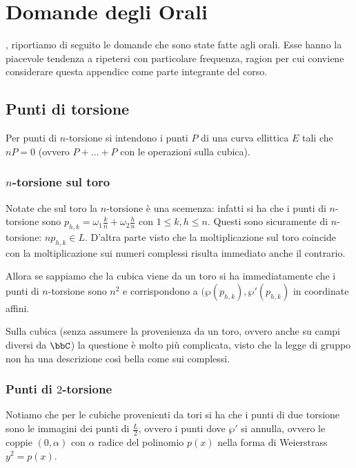 \chapter{Domande degli Orali}
\justify

, riportiamo di seguito le domande che sono state fatte agli orali.
Esse hanno la piacevole tendenza a ripetersi con particolare frequenza, ragion per cui conviene considerare questa appendice come parte integrante del corso.

\section{Punti di torsione}
Per punti di $n$-torsione si intendono i punti $P$ di una curva ellittica $E$ tali che $nP = 0$ (ovvero $P + \ldots + P$ con le operazioni sulla cubica).

\subsection{$n$-torsione sul toro}
Notate che sul toro la $n$-torsione è una scemenza: infatti si ha che i punti di $n$-torsione sono $p_{h, k} = \omega_1 \frac{k}{n} + \omega_2 \frac{h}{n}$ con $1 \le k, h \le n$.
Questi sono sicuramente di $n$-torsione: $n p_{h, k} \in L$. D'altra parte visto che la moltiplicazione sul toro coincide con la moltiplicazione sui numeri complessi risulta immediato anche il contrario.

Allora se sappiamo che la cubica viene da un toro si ha immediatamente che i punti di $n$-torsione sono $n^2$ e corrispondono a $(\wp(p_{h, k}), \wp'(p_{h, k})$ in coordinate affini.

Sulla cubica (senza assumere la provenienza da un toro, ovvero anche su campi diversi da $\bbC$) la questione è molto più complicata, visto che la legge di gruppo non ha una descrizione così bella come sui complessi.

\subsection{Punti di $2$-torsione}
Notiamo che per le cubiche provenienti da tori si ha che i punti di due torsione sono le immagini dei punti di $\frac{L}{2}$, ovvero i punti dove $\wp'$ si annulla, ovvero le coppie $(0, \alpha)$ con $\alpha$ radice del polinomio $p(x)$ nella forma di Weierstrass $y^2 = p(x)$.

